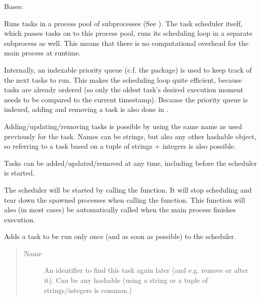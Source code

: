 \documentclass[letterpaper,10pt,english]{sphinxmanual}
\begin{document}
\begin{fulllineitems}
\label{\detokenize{periodic_tasks.task_scheduler:periodic_tasks.task_scheduler.TaskScheduler}}
Bases: 

Runs tasks in a process pool of subprocesses (See ).
The task scheduler itself, which passes tasks on to this process pool, runs its scheduling loop in a separate subprocess as well.
This means that there is no computational overhead for the main process at runtime.

Internally, an indexable priority queue (c.f. the  package) is used to keep track of the next tasks to run.
This makes the scheduling loop quite efficient, because tasks are already ordered (so only the oldest task’s desired execution moment needs to be compared to the current timestamp).
Because the priority queue is indexed, adding and removing a task is also done in .

Adding/updating/removing tasks is possible by using the same name as used previously for the task.
Names can be strings, but also any other hashable object, so referring to a task based on a tuple of strings + integers is also possible.

Tasks can be added/updated/removed at any time, including before the scheduler is started.

The scheduler will be started by calling the  function. It will stop scheduling and tear down the spawned processes when calling the  function.
This function will also (in most cases) be automatically called when the main process finishes execution.

\begin{fulllineitems}
\label{\detokenize{periodic_tasks.task_scheduler:periodic_tasks.task_scheduler.TaskScheduler.add_background_task}}
Adds a task to be run only once (and as soon as possible) to the scheduler.
\begin{quote}\begin{description}
\item[{Name}] \leavevmode
An identifier to find this task again later (and e.g. remove or alter it). Can be any hashable (using a string or a tuple of strings/integers is common.)


\end{description}
\end{quote}
\end{fulllineitems}
\end{fulllineitems}
\end{document}
